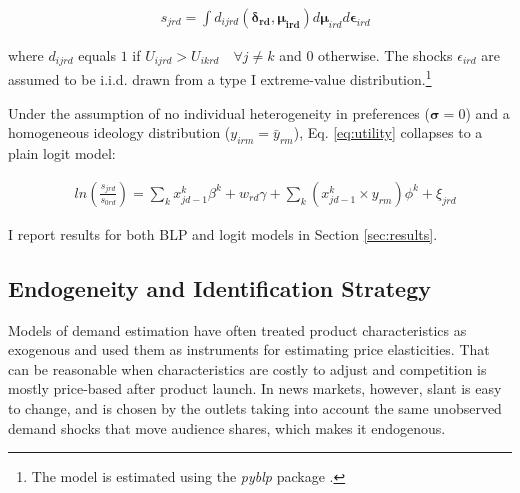 \documentclass[12pt]{article}
\begin{document}
	
	\begin{equation}\label{eq:shares}
	\begin{aligned}
		& s_{jrd} = \int d_{ijrd}(\bm{\delta_{rd}},\bm{\mu_{ird}})d\bm{\mu}_{ird}d\bm{\epsilon}_{ird}
	\end{aligned} 
\end{equation} 
	
	where $d_{ijrd}$ equals $1$ if $U_{ijrd}>U_{ikrd} \quad \forall j\neq k$ and $0$ otherwise. The shocks $\epsilon_{ird}$ are assumed to be i.i.d. drawn from a type I extreme-value distribution.\footnote{The model is estimated using the \textit{pyblp} package \citep{conlon2020best}.} 

Under the assumption of no individual heterogeneity in preferences  ($\bm{\sigma}=0$) and a homogeneous ideology distribution ($y_{irm}= \bar{y}_{rm}$),  Eq. \eqref{eq:utility} collapses to a plain logit model: 


\begin{equation}\label{eq:logit}
	\begin{aligned}
		& ln \left(\frac{s_{jrd}}{s_{0rd}}\right)= \sum_k x_{jd-1}^k\beta^k+w_{rd}   \gamma  +\sum_k \left(x_{jd-1}^k\times y_{rm} \right) \phi^k +  \xi_{jrd}
	\end{aligned} 
\end{equation} 


I report results for both  BLP and  logit models in  Section \ref{sec:results}. 
	
	\subsection{Endogeneity and Identification Strategy} \label{sec:endogeneity}
	\label{sec:identification}
	
	
Models of demand estimation have often treated product characteristics as exogenous and used them as instruments for estimating price elasticities. That can be reasonable when characteristics are costly to adjust and competition is mostly price-based after product launch. In news markets, however, slant is easy to change, and  is chosen by the outlets taking into account the same unobserved demand shocks that move audience shares, which makes it endogenous. 

	
\end{document}
